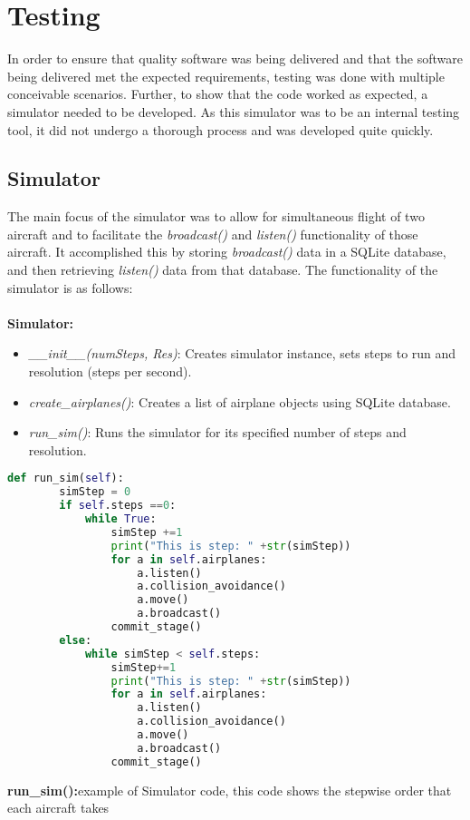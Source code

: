\documentclass[12pt]{report}
\theoremstyle{plain}
\theoremstyle{definition}
\begin{document}
\section*{Testing}
In order to ensure that quality software was being delivered and that the software being delivered met the expected requirements, testing was done with multiple conceivable scenarios.  Further, to show that the code worked as expected, a simulator needed to be developed.  As this simulator was to be an internal testing tool, it did not undergo a thorough process and was developed quite quickly.
\subsection*{Simulator}
The main focus of the simulator was to allow for simultaneous flight of two aircraft and to facilitate the \textit{broadcast()} and \textit{listen()} functionality of those aircraft.  It accomplished this by storing \textit{broadcast()} data in a SQLite database, and then retrieving \textit{listen()} data from that database.  The functionality of the simulator is as follows:\\
\\
\textbf{Simulator:} 
\begin{itemize}
\item\textit{\_\_init\_\_(numSteps, Res)}: Creates simulator instance, sets steps to run and resolution (steps per second).
\item\textit{create\_airplanes()}: Creates a list of airplane objects using SQLite database.
\item\textit{run\_sim()}: Runs the simulator for its specified number of steps and resolution.
\end{itemize}
\begin{lstlisting}[language =Python]
    def run_sim(self):
        simStep = 0
        if self.steps ==0:
            while True:
                simStep +=1
                print("This is step: " +str(simStep))
                for a in self.airplanes:
                    a.listen()
                    a.collision_avoidance()
                    a.move()
                    a.broadcast()
                commit_stage()
        else:
            while simStep < self.steps:
                simStep+=1
                print("This is step: " +str(simStep))
                for a in self.airplanes:
                    a.listen()
                    a.collision_avoidance()
                    a.move()
                    a.broadcast()
                commit_stage()
\end{lstlisting}
\begin{center}
\footnotesize{\textbf{run\_sim():}example of Simulator code, this code shows the stepwise order that each aircraft takes}
\end{center}
\end{document}
